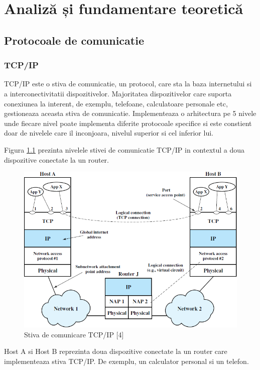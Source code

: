 \chapter{Analiză și fundamentare teoretică}
\label{ch:analysis}
\pagestyle{fancy}

\section{Protocoale de comunicatie}\label{sec:protocols}
\subsection{TCP/IP}\label{subsec:tcpip}
TCP/IP este o stiva de comunicatie, un protocol, care sta la baza internetului si a interconectivitatii dispozitivelor. Majoritatea dispozitivelor 
care suporta conexiunea la interent, de exemplu, telefoane, calculatoare personale etc, gestioneaza aceasta stiva de comunicatie. Implementeaza o arhitectura 
pe 5 nivele unde fiecare nivel poate implementa diferite protocoale specifice si este constient doar de nivelele care il inconjoara, nivelul superior 
si cel inferior lui. 

Figura \ref{fig:TCPIP_Layers} prezinta nivelele stivei de comunicatie TCP/IP in contextul a doua dispozitive conectate la un router.
\begin{figure}[H]
    \centering
    \includegraphics[scale=0.8]{figs/TCPIP_Layers.png}
    \caption{Stiva de comunicare TCP/IP [4]}
    \label{fig:TCPIP_Layers}
\end{figure}

Host A si Host B reprezinta doua dispozitive conectate la un router care implementeaza stiva TCP/IP. De exemplu, un calculator personal si un telefon.

